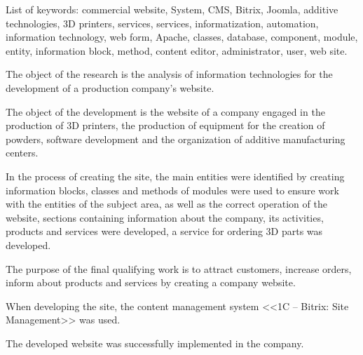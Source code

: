 List of keywords: commercial website, System, CMS, Bitrix, Joomla, additive technologies, 3D printers, services, services, informatization, automation, information technology, web form, Apache, classes, database, component, module, entity, information block, method, content editor, administrator, user, web site.

The object of the research is the analysis of information technologies for the development of a production company's website.

The object of the development is the website of a company engaged in the production of 3D printers, the production of equipment for the creation of powders, software development and the organization of additive manufacturing centers.

In the process of creating the site, the main entities were identified by creating information blocks, classes and methods of modules were used to ensure work with the entities of the subject area, as well as the correct operation of the website, sections containing information about the company, its activities, products and services were developed, a service for ordering 3D parts was developed.

The purpose of the final qualifying work is to attract customers, increase orders, inform about products and services by creating a company website.

When developing the site, the content management system <<1C – Bitrix: Site Management>> was used.

The developed website was successfully implemented in the company.
